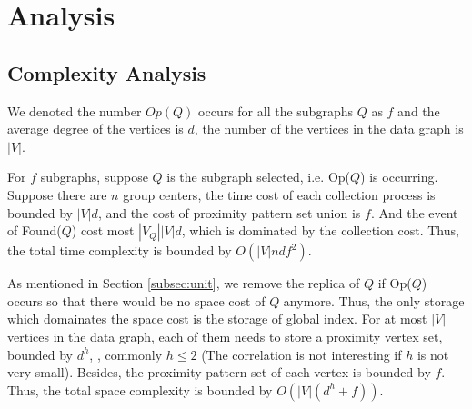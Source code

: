 
\section{Analysis}
\label{sec:analysis}

\subsection{Complexity Analysis}
We denoted the number $Op(Q)$ occurs for all the subgraphs $Q$ as $f$ and the average degree of the vertices is $d$, the number of the vertices in the data graph is $|V|$.

 For $f$ subgraphs, suppose $Q$ is the subgraph selected, i.e. {\sf Op($Q$)} is occurring. Suppose there are $n$ group centers, the time cost of each collection process is bounded by $|V|d$, and the cost of proximity pattern set union is $f$. And the event of {\sf Found($Q$)} cost most $|V_Q||V|d$, which is dominated by the collection cost. Thus, the total time complexity is bounded by $O(|V|ndf^2)$.


As mentioned in Section \ref{subsec:unit}, we remove the replica of $Q$ if {\sf Op($Q$)} occurs so that there would be no space cost of $Q$ anymore. Thus, the only storage which domainates the space cost is the storage of global index. For at most $|V|$ vertices in the data graph, each of them needs to store a proximity vertex set, bounded by $d^h$, , commonly $h\le 2$ (The correlation is not interesting if $h$ is not very small). Besides, the proximity pattern set of each vertex is bounded by $f$. Thus, the total space complexity is bounded by $O(|V|(d^h+f))$.



